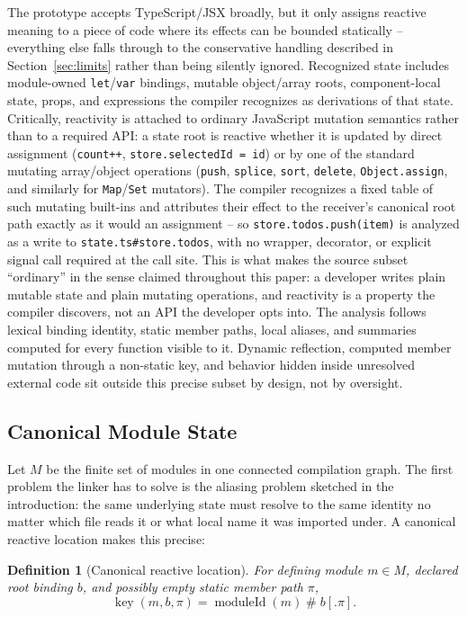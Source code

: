 \documentclass[conference]{IEEEtran}
\newtheorem{definition}{Definition}
\begin{document}
The prototype accepts TypeScript/JSX broadly, but it only assigns reactive
meaning to a piece of code where its effects can be bounded statically --
everything else falls through to the conservative handling described in
Section~\ref{sec:limits} rather than being silently ignored. Recognized state
includes module-owned \texttt{let}/\texttt{var} bindings, mutable
object/array roots, component-local state, props, and expressions the
compiler recognizes as derivations of that state. Critically, reactivity is
attached to ordinary JavaScript mutation semantics rather than to a required
API: a state root is reactive whether it is updated by direct assignment
(\texttt{count++}, \texttt{store.selectedId = id}) or by one of the standard
mutating array/object operations (\texttt{push}, \texttt{splice},
\texttt{sort}, \texttt{delete}, \texttt{Object.assign}, and similarly for
\texttt{Map}/\texttt{Set} mutators). The compiler recognizes a fixed table of
such mutating built-ins and attributes their effect to the receiver's
canonical root path exactly as it would an assignment -- so
\texttt{store.todos.push(item)} is analyzed as a write to
\texttt{state.ts\#store.todos}, with no wrapper, decorator, or explicit
signal call required at the call site. This is what makes the source subset
``ordinary'' in the sense claimed throughout this paper: a developer writes
plain mutable state and plain mutating operations, and reactivity is a
property the compiler discovers, not an API the developer opts into. The
analysis follows lexical binding identity, static member paths, local
aliases, and summaries computed for every function visible to it. Dynamic
reflection, computed member mutation through a non-static key, and behavior
hidden inside unresolved external code sit outside this precise subset by
design, not by oversight.

\subsection{Canonical Module State}

Let $M$ be the finite set of modules in one connected compilation graph. The
first problem the linker has to solve is the aliasing problem sketched in the
introduction: the same underlying state must resolve to the same identity no
matter which file reads it or what local name it was imported under. A
canonical reactive location makes this precise:

\begin{definition}[Canonical reactive location]
\label{def:key}
For defining module $m\in M$, declared root binding $b$, and possibly empty
static member path $\pi$,
\[
  \operatorname{key}(m,b,\pi)
  = \operatorname{moduleId}(m)\mathbin{\#}b[.\pi].
\]
\end{definition}
\end{document}
